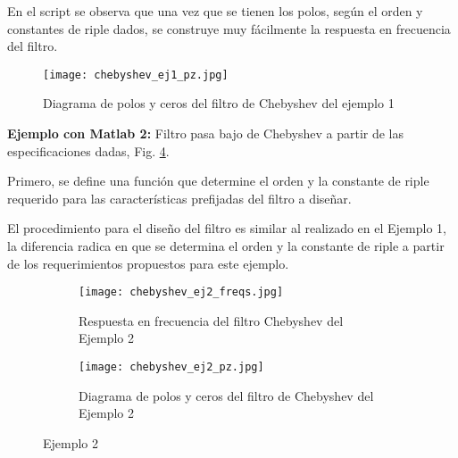 \documentclass[informe.tex]{subfiles}
\begin{document}
      

En el script se observa que una vez que se tienen los polos, según el orden y constantes de riple dados, se construye muy fácilmente la respuesta en frecuencia del filtro.
    	
	\begin{figure}[h]
		\centering
		\texttt{[image: chebyshev\_ej1\_pz.jpg]}
		\caption{Diagrama de polos y ceros del filtro de Chebyshev del ejemplo 1}
		\label{fig:func:chebyshev:ej1}
	\end{figure}
	
\textbf{\newpage Ejemplo con Matlab 2:} Filtro pasa bajo de Chebyshev a partir de las especificaciones dadas, Fig. \ref{fig:func:chebyshev:ej2}. \newline 
  
Primero, se define una función que determine el orden y la constante de riple requerido para las características prefijadas del filtro a diseñar.\newline
 
   
   
El procedimiento para el diseño del filtro es similar al realizado en el Ejemplo 1, la diferencia radica en que se determina el orden  y la constante de riple a partir de los requerimientos propuestos para este ejemplo.
   
     
    	
\begin{figure}[h]
     \centering
     \begin{subfigure}[b]{1\textwidth}
         \centering
         \texttt{[image: chebyshev\_ej2\_freqs.jpg]}
         \caption{Respuesta en frecuencia del filtro Chebyshev del Ejemplo 2}
         \label{fig:func:chebyshev:ej2:freqs_bp}
     \end{subfigure}
     \bigskip
     \begin{subfigure}[b]{1\textwidth}
         \centering
         \texttt{[image: chebyshev\_ej2\_pz.jpg]}
         \caption{Diagrama de polos y ceros del filtro de Chebyshev del Ejemplo 2}
         \label{fig:func:chebyshev:ej2:pz}
     \end{subfigure}
     \caption{Ejemplo 2}
     \label{fig:func:chebyshev:ej2}
\end{figure}

	
\end{document}
